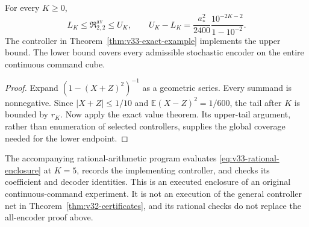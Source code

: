 \begin{corollary}\label{cor:v33-enclosure}
For every $K\ge0$,
\[
 L_K\le\mathfrak R_{2,2}^{\mathrm{av}}\le U_K,
 \qquad U_K-L_K=\frac{a_*^2}{2400}
                         \frac{10^{-2K-2}}{1-10^{-2}}.
\]
The controller in Theorem~\ref{thm:v33-exact-example} implements
the upper bound. The lower bound covers every admissible stochastic
encoder on the entire continuous command cube.
\end{corollary}
\begin{proof}
Expand $(1-(X+Z)^2)^{-1}$ as a geometric series. Every summand
is nonnegative. Since $|X+Z|\le1/10$ and
$\mathbb E(X-Z)^2=1/600$, the tail after $K$ is bounded by $r_K$.
Now apply the exact value theorem. Its upper-tail argument, rather
than enumeration of selected controllers, supplies the global
coverage needed for the lower endpoint.
\end{proof}

The accompanying rational-arithmetic program evaluates
\eqref{eq:v33-rational-enclosure} at $K=5$, records the implementing
controller, and checks its coefficient and decoder identities.
This is an executed enclosure of an original continuous-command
experiment. It is not an execution of the general controller net
in Theorem~\ref{thm:v32-certificates}, and its rational checks do
not replace the all-encoder proof above.

